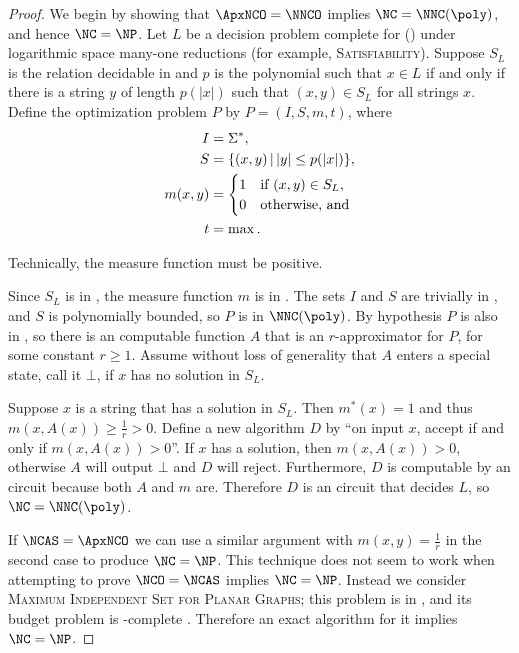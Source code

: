 \documentclass[]{article}
\let\originalleft\left
\let\originalright\right
\renewcommand{\left}{\mathopen{}\mathclose\bgroup\originalleft}
\renewcommand{\right}{\aftergroup\egroup\originalright}
\begin{document}
\begin{proof}
  We begin by showing that $\ApxNCO = \NNCO$ implies $\NC = \NNC(\poly)$, and hence $\NC = \NP$.
  Let $L$ be a decision problem complete for \NNC(\poly) under logarithmic space many-one reductions (for example, \textsc{Satisfiability}).
  Suppose $S_L$ is the relation decidable in \NC{} and $p$ is the polynomial such that $x \in L$ if and only if there is a string $y$ of length $p(|x|)$ such that $(x, y) \in S_L$ for all strings $x$.
  Define the optimization problem $P$ by $P = (I, S, m, t)$, where
  \begin{align*}
    I & = \Sigma^*, \\
    S & = \left\{ (x, y) \,\middle|\, |y| \leq p(|x|) \right\}, \\
    m(x, y) & =
    \begin{cases}
      1 & \text{if } (x, y) \in S_L, \\
      0 & \text{otherwise, and}
    \end{cases} \\
    t & = \max.
  \end{align*}
  \begin{todo}
    Technically, the measure function must be positive.
  \end{todo}
  Since $S_L$ is in \NC, the measure function $m$ is in \FNC.
  The sets $I$ and $S$ are trivially in \NC, and $S$ is polynomially bounded, so $P$ is in $\NNC(\poly)$.
  By hypothesis $P$ is also in \ApxNCO, so there is an \NC{} computable function $A$ that is an $r$-approximator for $P$, for some constant $r \geq 1$.
  Assume without loss of generality that $A$ enters a special state, call it $\bot$, if $x$ has no solution in $S_L$.

  Suppose $x$ is a string that has a solution in $S_L$.
  Then $m^*(x) = 1$ and thus $m(x, A(x)) \geq \frac{1}{r} > 0$.
  Define a new algorithm $D$ by ``on input $x$, accept if and only if $m(x, A(x)) > 0$''.
  If $x$ has a solution, then $m(x, A(x)) > 0$, otherwise $A$ will output $\bot$ and $D$ will reject.
  Furthermore, $D$ is computable by an \NC{} circuit because both $A$ and $m$ are.
  Therefore $D$ is an \NC circuit that decides $L$, so $\NC = \NNC(\poly)$.

  If $\NCAS = \ApxNCO$ we can use a similar argument with $m(x, y) = \frac{1}{r}$ in the second case to produce $\NC = \NP$.
  This technique does not seem to work when attempting to prove $\NCO = \NCAS$ implies $\NC = \NP$.
  Instead we consider \textsc{Maximum Independent Set for Planar Graphs}; this problem is in \NCAS{} \cite[Theorem~5.2.1]{dsst97}, and its budget problem is \NP-complete \cite{gj79}.
  Therefore an exact \NC{} algorithm for it implies $\NC = \NP$.
\end{proof}
\end{document}
